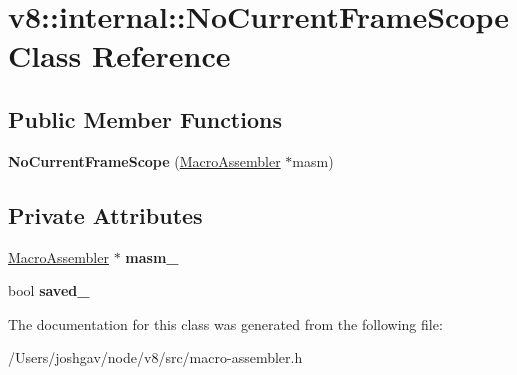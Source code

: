\hypertarget{classv8_1_1internal_1_1_no_current_frame_scope}{}\section{v8\+:\+:internal\+:\+:No\+Current\+Frame\+Scope Class Reference}
\label{classv8_1_1internal_1_1_no_current_frame_scope}
\subsection*{Public Member Functions}
\begin{DoxyCompactItemize}
\item 
{\bfseries No\+Current\+Frame\+Scope} (\hyperlink{classv8_1_1internal_1_1_macro_assembler}{Macro\+Assembler} $\ast$masm)\hypertarget{classv8_1_1internal_1_1_no_current_frame_scope_ab7307b6340dc7e49193c60a82aef3a5e}{}\label{classv8_1_1internal_1_1_no_current_frame_scope_ab7307b6340dc7e49193c60a82aef3a5e}

\end{DoxyCompactItemize}
\subsection*{Private Attributes}
\begin{DoxyCompactItemize}
\item 
\hyperlink{classv8_1_1internal_1_1_macro_assembler}{Macro\+Assembler} $\ast$ {\bfseries masm\+\_\+}\hypertarget{classv8_1_1internal_1_1_no_current_frame_scope_a12e186f93f37813fa67b87571e8c598b}{}\label{classv8_1_1internal_1_1_no_current_frame_scope_a12e186f93f37813fa67b87571e8c598b}

\item 
bool {\bfseries saved\+\_\+}\hypertarget{classv8_1_1internal_1_1_no_current_frame_scope_a8c9409b6461ef542be3e531a421b6c46}{}\label{classv8_1_1internal_1_1_no_current_frame_scope_a8c9409b6461ef542be3e531a421b6c46}

\end{DoxyCompactItemize}


The documentation for this class was generated from the following file\+:\begin{DoxyCompactItemize}
\item 
/\+Users/joshgav/node/v8/src/macro-\/assembler.\+h\end{DoxyCompactItemize}
